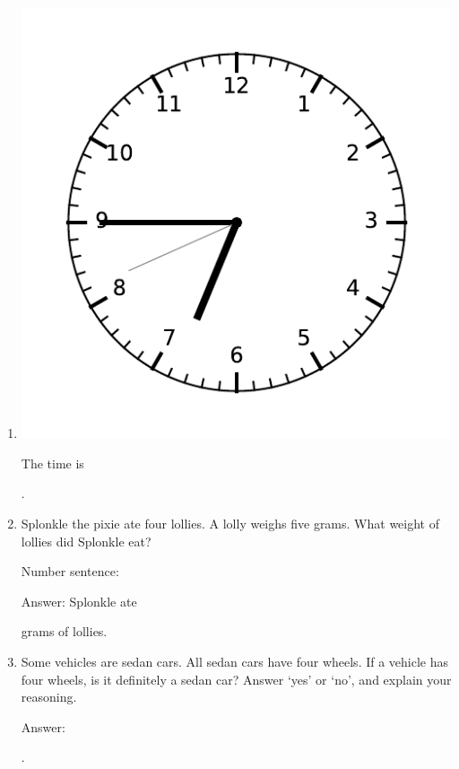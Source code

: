 \documentclass{tufte-book}
\begin{document}
\begin{enumerate}

\item \begin{marginfigure}\includegraphics[width=\textwidth]{fig/clock_0645.pdf}\end{marginfigure}
The time is \dotfill\bigskip\par\dotfill\bigskip.\par

\item Splonkle the pixie ate four lollies. A lolly weighs five grams.
What weight of lollies did Splonkle eat?\bigskip\par
Number sentence: \dotfill\bigskip\par
Answer: Splonkle ate \dotfill\bigskip\par\dotfill\bigskip
grams of lollies.

\item Some vehicles are sedan cars. All sedan cars have four wheels.
If a vehicle has four wheels, is it definitely a sedan car? Answer `yes' or `no',
and explain your reasoning.\bigskip\par
Answer: \dotfill\bigskip\par\dotfill\bigskip\par\dotfill\bigskip\par\dotfill\bigskip.


\end{enumerate}
\end{document}
